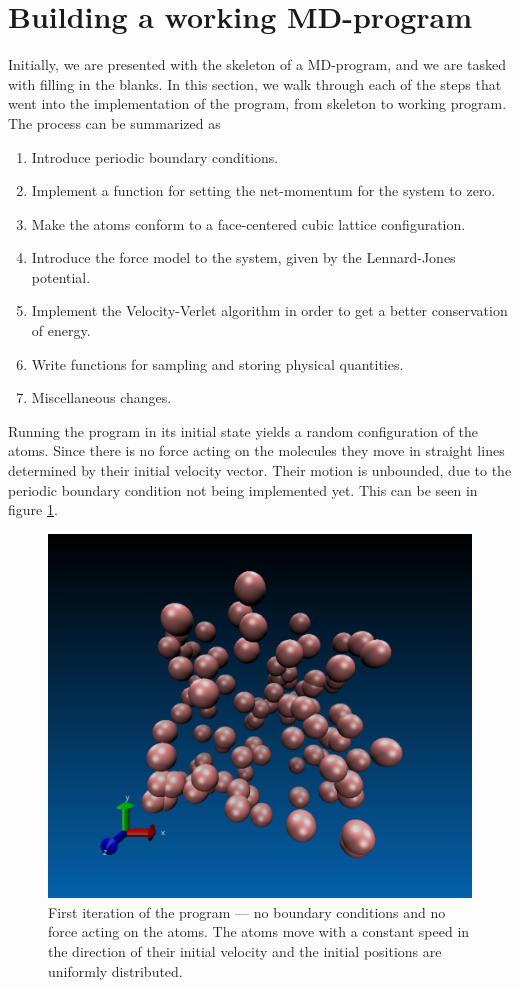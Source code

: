 \documentclass[a4paper]{article}
\begin{document}
\section{Building a working MD-program}
\label{sec:building_a_working_md_program}
    
    Initially, we are presented with the skeleton of a MD-program, and we are
    tasked with filling in the blanks. In this section, we walk through each of
    the steps that went into the implementation of the program, from skeleton
    to working program. The process can be summarized as
    
    \begin{enumerate}[1)]
        \item Introduce periodic boundary conditions.
        \item Implement a function for setting the net-momentum for the system to zero.
        \item Make the atoms conform to a face-centered cubic lattice configuration.
        \item Introduce the force model to the system, given by the Lennard-Jones potential.
        \item Implement the Velocity-Verlet algorithm in order to get a better
            conservation of energy.
        \item Write functions for sampling and storing physical quantities.
        \item Miscellaneous changes.
    \end{enumerate}
    
    Running the program in its initial state yields a random configuration of
    the atoms. Since there is no force acting on the molecules they move in
    straight lines determined by their initial velocity vector. Their motion is
    unbounded, due to the periodic boundary condition not being implemented
    yet. This can be seen in figure \ref{fig:first_iteration}.

    \begin{figure}
        \centering \includegraphics[width=0.4\linewidth]{first_iteration.png}
        \caption[Initial state of the program]{First iteration of the program --- no boundary conditions and
            no force acting on the atoms. The atoms move with a constant speed
            in the direction of their initial velocity and the initial
        positions are uniformly distributed.}
        \label{fig:first_iteration}
    \end{figure}
\end{document}

